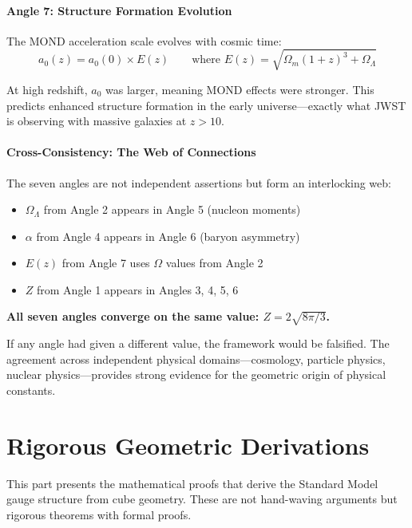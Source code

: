 \documentclass[11pt,a4paper]{article}
\theoremstyle{plain}
\theoremstyle{definition}
\theoremstyle{remark}
\newcommand{\Omegam}{\Omega_m}
\newcommand{\OmegaL}{\Omega_\Lambda}
\begin{document}
\subsection{Angle 7: Structure Formation Evolution}

The MOND acceleration scale evolves with cosmic time:
\[
a_0(z) = a_0(0) \times E(z) \qquad \text{where } E(z) = \sqrt{\Omegam(1+z)^3 + \OmegaL}
\]

At high redshift, $a_0$ was larger, meaning MOND effects were stronger. This predicts enhanced structure formation in the early universe---exactly what JWST is observing with massive galaxies at $z > 10$.

\subsection{Cross-Consistency: The Web of Connections}

The seven angles are not independent assertions but form an interlocking web:
\begin{itemize}
  \item $\OmegaL$ from Angle 2 appears in Angle 5 (nucleon moments)
  \item $\alpha$ from Angle 4 appears in Angle 6 (baryon asymmetry)
  \item $E(z)$ from Angle 7 uses $\Omega$ values from Angle 2
  \item $Z$ from Angle 1 appears in Angles 3, 4, 5, 6
\end{itemize}

\textbf{All seven angles converge on the same value: $Z = 2\sqrt{8\pi/3}$.}

If any angle had given a different value, the framework would be falsified. The agreement across independent physical domains---cosmology, particle physics, nuclear physics---provides strong evidence for the geometric origin of physical constants.

\part{Rigorous Geometric Derivations}

This part presents the mathematical proofs that derive the Standard Model gauge structure from cube geometry. These are not hand-waving arguments but rigorous theorems with formal proofs.
\end{document}
